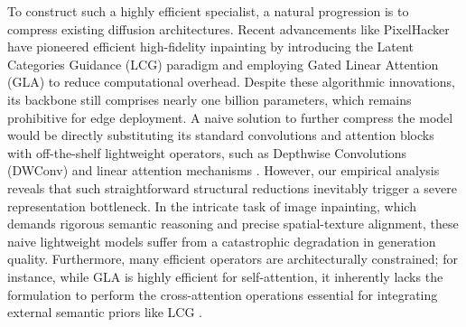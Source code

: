 \documentclass[runningheads]{llncs}
\begin{document}
\vspace{-0.5em}
To construct such a highly efficient specialist, a natural progression is to compress existing diffusion architectures. Recent advancements like PixelHacker \cite{xu2025pixelhacker} have pioneered efficient high-fidelity inpainting by introducing the Latent Categories Guidance (LCG) paradigm and employing Gated Linear Attention (GLA) \cite{yang2024gla} to reduce computational overhead. Despite these algorithmic innovations, its backbone still comprises nearly one billion parameters, which remains prohibitive for edge deployment. A naive solution to further compress the model would be directly substituting its standard convolutions and attention blocks with off-the-shelf lightweight operators, such as Depthwise Convolutions (DWConv) \cite{Sandler2018MobileNetV2} and linear attention mechanisms \cite{yang2024gla,dao2022flashattention,dao2023flashattention2}. However, our empirical analysis reveals that such straightforward structural reductions inevitably trigger a severe representation bottleneck. In the intricate task of image inpainting, which demands rigorous semantic reasoning and precise spatial-texture alignment, these naive lightweight models suffer from a catastrophic degradation in generation quality. Furthermore, many efficient operators are architecturally constrained; for instance, while GLA \cite{yang2024gla} is highly efficient for self-attention, it inherently lacks the formulation to perform the cross-attention operations essential for integrating external semantic priors like LCG \cite{xu2025pixelhacker}.
\end{document}
